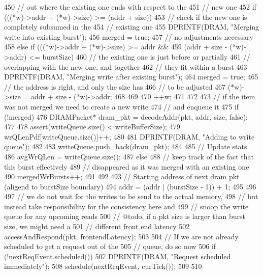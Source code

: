 \begin{DoxyCode}
{{{{450                 // out where the existing one ends with respect to the
451                 // new one
452                 if (((*w)->addr + (*w)->size) >= (addr + size)) {
453                     // check if the new one is completely subsumed in the
454                     // existing one
455                     DPRINTF(DRAM, "Merging write into existing burst\n");
456                     merged = true;
457                     // no adjustments necessary
458                 } else if (((*w)->addr + (*w)->size) >= addr &&
459                            (addr + size - (*w)->addr) <= burstSize) {
460                     // the existing one is just before or partially
461                     // overlapping with the new one, and together
462                     // they fit within a burst
463                     DPRINTF(DRAM, "Merging write after existing burst\n");
464                     merged = true;
465                     // the address is right, and only the size has
466                     // to be adjusted
467                     (*w)->size = addr + size - (*w)->addr;
468                 }
469             }
470             ++w;
471         }
472 
473         // if the item was not merged we need to create a new write
474         // and enqueue it
475         if (!merged) {
476             DRAMPacket* dram_pkt = decodeAddr(pkt, addr, size, false);
477 
478             assert(writeQueue.size() < writeBufferSize);
479             wrQLenPdf[writeQueue.size()]++;
480 
481             DPRINTF(DRAM, "Adding to write queue\n");
482 
483             writeQueue.push_back(dram_pkt);
484 
485             // Update stats
486             avgWrQLen = writeQueue.size();
487         } else {
488             // keep track of the fact that this burst effectively
489             // disappeared as it was merged with an existing one
490             mergedWrBursts++;
491         }
492 
493         // Starting address of next dram pkt (aligend to burstSize boundary)
494         addr = (addr | (burstSize - 1)) + 1;
495     }
496 
497     // we do not wait for the writes to be send to the actual memory,
498     // but instead take responsibility for the consistency here and
499     // snoop the write queue for any upcoming reads
500     // @todo, if a pkt size is larger than burst size, we might need a
501     // different front end latency
502     accessAndRespond(pkt, frontendLatency);
503 
504     // If we are not already scheduled to get a request out of the
505     // queue, do so now
506     if (!nextReqEvent.scheduled()) {
507         DPRINTF(DRAM, "Request scheduled immediately\n");
508         schedule(nextReqEvent, curTick());
509     }
510 }
\end{DoxyCode}
